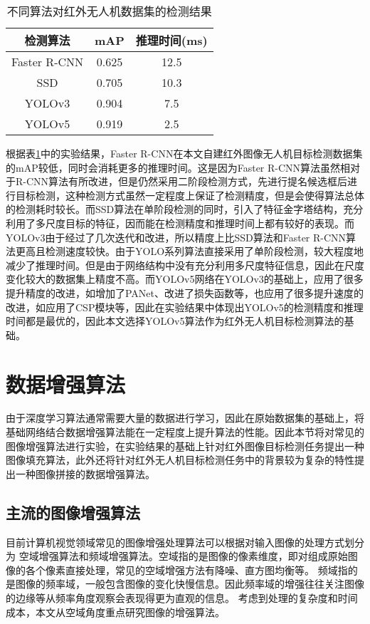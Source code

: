 \begin{table}[htbp]
  \caption{不同算法对红外无人机数据集的检测结果}
  \vspace{0.5em}\centering\wuhao
  \begin{tabular}{ccc}
  \toprule
  检测算法 & mAP & 推理时间(ms)\\
  \midrule
  Faster R-CNN & 0.625 & 12.5\\
  SSD & 0.705 & 10.3\\
  YOLOv3 & 0.904 & 7.5\\
  YOLOv5 & 0.919 & 2.5\\
  \bottomrule
  \end{tabular}
  \label{t11}
\end{table}

根据表\ref{t11}中的实验结果，Faster R-CNN在本文自建红外图像无人机目标检测数据集的mAP较低，同时会消耗更多的推理时间。这是因为Faster R-CNN算法虽然相对于R-CNN算法有所改进，但是仍然采用二阶段检测方式，先进行提名候选框后进行目标检测，这种检测方式虽然一定程度上保证了检测精度，但是会使得算法总体的检测耗时较长。而SSD算法在单阶段检测的同时，引入了特征金字塔结构，充分利用了多尺度目标的特征，因而能在检测精度和推理时间上都有较好的表现。而YOLOv3由于经过了几次迭代和改进，所以精度上比SSD算法和Faster R-CNN算法更高且检测速度较快。由于YOLO系列算法直接采用了单阶段检测，较大程度地减少了推理时间。但是由于网络结构中没有充分利用多尺度特征信息，因此在尺度变化较大的数据集上精度不高。而YOLOv5网络在YOLOv3的基础上，应用了很多提升精度的改进，如增加了PANet、改进了损失函数等，也应用了很多提升速度的改进，如应用了CSP模块等，因此在实验结果中体现出YOLOv5的检测精度和推理时间都是最优的，因此本文选择YOLOv5算法作为红外无人机目标检测算法的基础。

\section{数据增强算法}
由于深度学习算法通常需要大量的数据进行学习，因此在原始数据集的基础上，将基础网络结合数据增强算法能在一定程度上提升算法的性能。因此本节将对常见的图像增强算法进行实验，在实验结果的基础上针对红外图像目标检测任务提出一种图像填充算法，此外还将针对红外无人机目标检测任务中的背景较为复杂的特性提出一种图像拼接的数据增强算法。

\subsection{主流的图像增强算法}
目前计算机视觉领域常见的图像增强处理算法可以根据对输入图像的处理方式划分为
空域增强算法和频域增强算法。空域指的是图像的像素维度，即对组成原始图像的各个像素直接处理，常见的空域增强方法有降噪、直方图均衡等。
频域指的是图像的频率域，一般包含图像的变化快慢信息。因此频率域的增强往往关注图像的边缘等从频率角度观察会表现得更为直观的信息。
考虑到处理的复杂度和时间成本，本文从空域角度重点研究图像的增强算法。

